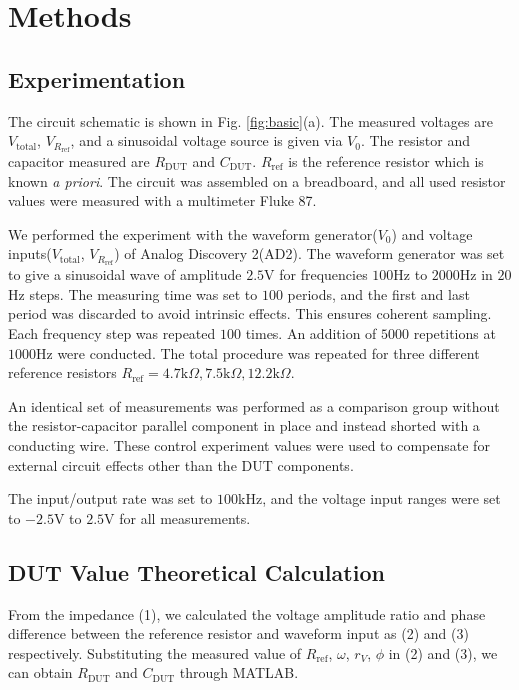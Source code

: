 \documentclass[%
 aip,
 amsmath,amssymb,
 reprint,%
]{revtex4-1}
\begin{document}
\section{\label{sec:Methods} Methods}
\subsection{Experimentation}
The circuit schematic is shown in Fig. \ref{fig:basic}(a). The measured voltages are $V_{\textrm{total}}$, $V_{R_{\textrm{ref}}}$, and a sinusoidal voltage source is given via $V_0$. The resistor and capacitor measured are $R_{\textrm{DUT}}$ and $C_{\textrm{DUT}}$. $R_{\textrm{ref}}$ is the reference resistor which is known \textit{a priori}. The circuit was assembled on a breadboard, and all used resistor values were measured with a multimeter Fluke 87.

We performed the experiment with the waveform generator($V_0$) and voltage inputs($V_{\textrm{total}}$, $V_{R_{\textrm{ref}}}$) of Analog Discovery 2(AD2). The waveform generator was set to give a sinusoidal wave of amplitude $2.5$V for frequencies $100$Hz to $2000$Hz in $20$Hz steps. The measuring time was set to $100$ periods, and the first and last period was discarded to avoid intrinsic effects. This ensures coherent sampling. Each frequency step was repeated $100$ times. An addition of $5000$ repetitions at $1000$Hz were conducted. The total procedure was repeated for three different reference resistors $R_{\textrm{ref}} = 4.7\text{k}\Omega, 7.5\text{k}\Omega, 12.2\text{k} \Omega$.

An identical set of measurements was performed as a comparison group without the resistor-capacitor parallel component in place and instead shorted with a conducting wire. These control experiment values were used to compensate for external circuit effects other than the DUT components. 

The input/output rate was set to $100$kHz, and the voltage input ranges were set to $-2.5$V to $2.5$V for all measurements.

\subsection{DUT Value Theoretical Calculation}
 From the impedance (1), we calculated the voltage amplitude ratio and phase difference between the reference resistor and waveform input as (2) and (3) respectively. Substituting the measured value of $R_{\textrm{ref}}$, $\omega$, $r_{V}$, $\phi$ in (2) and (3), we can obtain $R_{\textrm{DUT}}$ and $C_{\textrm{DUT}}$ through MATLAB.
\end{document}
